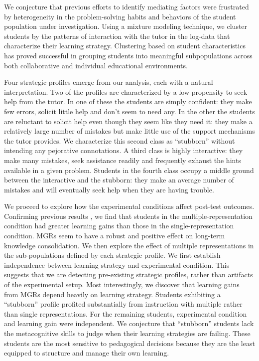 \documentclass{edm_template}
\begin{document}
We conjecture that previous efforts to identify mediating factors were frustrated by heterogeneity in the problem-solving habits and behaviors of the student population under investigation. Using a mixture modeling technique, we cluster students by the patterns of interaction with the tutor in the log-data that characterize their learning strategy. Clustering based on student characteristics has proved successful in grouping students into meaningful subpopulations across both collaborative \cite{Perera2009} and individual \cite{Merceron2005} educational environments. 

Four strategic profiles emerge from our analysis, each with a natural interpretation. Two of the profiles are characterized by a low propensity to seek help from the tutor. In one of these the students are simply confident: they make few errors, solicit little help and don't seem to need any. In the other the students are reluctant to solicit help even though they seem like they need it: they make a relatively large number of mistakes but make little use of the support mechanisms the tutor provides. We characterize this second class as ``stubborn'' without intending any pejorative connotations. A third class is highly interactive: they make many mistakes, seek assistance readily and frequently exhaust the hints available in a given problem. Students in the fourth class occupy a middle ground between the interactive and the stubborn: they make an average number of mistakes and will eventually seek help when they are having trouble.

We proceed to explore how the experimental conditions affect post-test outcomes. Confirming previous results \cite{Rau2012}, we find that students in the multiple-representation condition had greater learning gains than those in the single-representation condition. MGRs seem to have a robust and positive effect on long-term knowledge consolidation. We then explore the effect of multiple representations in the sub-populations defined by each strategic profile. We first establish independence between learning strategy and experimental condition. This suggests that we are detecting pre-existing strategic profiles, rather than artifacts of the experimental setup. Most interestingly, we discover that learning gains from MGRs depend heavily on learning strategy. Students exhibiting a ``stubborn'' profile profited substantially from instruction with multiple rather than single representations. For the remaining students, experimental condition and learning gain were independent. We conjecture that ``stubborn'' students lack the metacognitive skills to judge when their learning strategies are failing. These students are the most sensitive to pedagogical decisions because they are the least equipped to structure and manage their own learning. 
\end{document}
